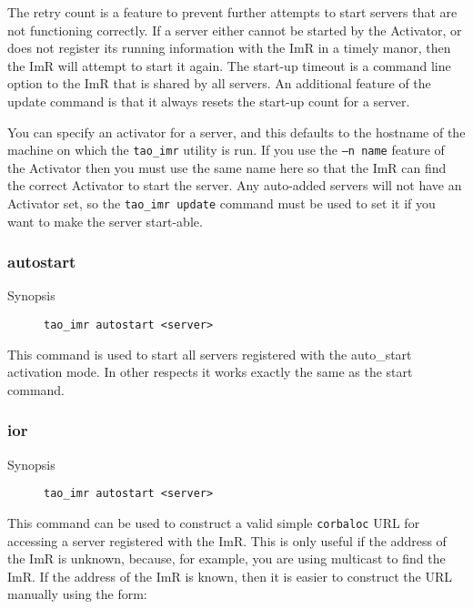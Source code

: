 \begin{itemize}
{\begin{itemize}
{{The retry count is a feature to prevent further attempts to start servers that 
are not functioning correctly. If a server either cannot be started by the 
Activator, or does not register its running information with the ImR in a timely 
manor, then the ImR will attempt to start it again. The start-up timeout is a 
command line option to the ImR that is shared by all servers. An additional 
feature of the update command is that it always resets the start-up count for 
a server. 

You can specify an activator for a server, and this defaults to the hostname 
of the machine on which the {\tt tao\_imr} utility is run. If you use the 
{\tt –n name} feature of the Activator then you must use the same name 
here so that the ImR can find the correct Activator to start the server. 
Any auto-added servers will not have an Activator set, so the 
{\tt tao\_imr update} command must be used to set it if you want to make 
the server start-able.
 
\subsubsection{autostart}

\begin{description}
    \item [Synopsis] {\tt tao\_imr autostart <server>}
\end{description}

This command is used to start all servers registered with the auto_start 
activation mode. In other respects it works exactly the same as the 
start command. 

\subsubsection{ior}

\begin{description}
    \item [Synopsis] {\tt tao\_imr autostart <server>}
\end{description}

This command can be used to construct a valid simple {\tt corbaloc} URL 
for accessing a server registered with the ImR. This is only useful if the 
address of the ImR is unknown, because, for example, you are using multicast 
to find the ImR.  If the address of the ImR is known, then it is easier to construct 
the URL manually using the form:


}}
\end{itemize}}
\end{itemize}
